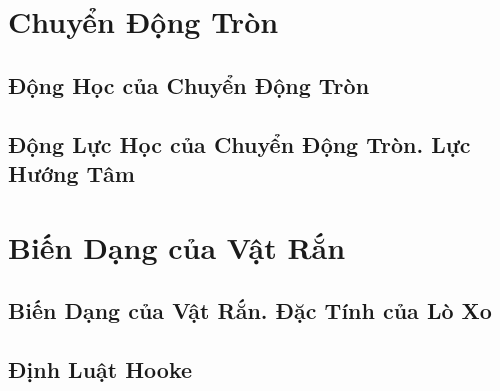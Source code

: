 \documentclass[oneside]{book}
\numberwithin{equation}{section}
\begin{document}

\chapter{Chuyển Động Tròn}

\section{Động Học của Chuyển Động Tròn}

\section{Động Lực Học của Chuyển Động Tròn. Lực Hướng Tâm}


\chapter{Biến Dạng của Vật Rắn}

\section{Biến Dạng của Vật Rắn. Đặc Tính của Lò Xo}

\section{Định Luật Hooke}


\printbibliography[heading=bibintoc]
	
\end{document}
